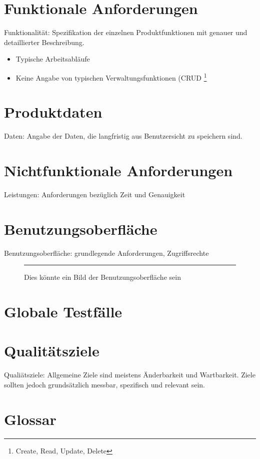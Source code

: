 \documentclass[a4paper]{scrreprt}
\begin{document}
\chapter{Funktionale Anforderungen}
Funktionalität: Spezifikation der einzelnen Produktfunktionen mit genauer und
detaillierter Beschreibung.
 
\begin{itemize}
  \item Typische Arbeitsabläufe
  \item Keine Angabe von typischen Verwaltungsfunktionen (CRUD \footnote{Create,
Read, Update, Delete}
\end{itemize}
 
\chapter{Produktdaten}
Daten: Angabe der Daten, die langfristig aus Benutzersicht zu speichern sind.
 
\chapter{Nichtfunktionale Anforderungen}
Leistungen: Anforderungen bezüglich Zeit und Genauigkeit
 
\chapter{Benutzungsoberfläche}
Benutzungsoberfläche: grundlegende Anforderungen, Zugriffsrechte
 
\begin{figure}[ht]
  \centering
  \rule{8cm}{6cm}
  \caption{Dies könnte ein Bild der Benutzungsoberfläche sein}
\end{figure}

\chapter{Globale Testfälle}
 
\chapter{Qualitätsziele}
Qualiätsziele: Allgemeine Ziele sind meistens Änderbarkeit und Wartbarkeit.
Ziele sollten jedoch grundsätzlich messbar, spezifisch und relevant sein.
 
\chapter{Glossar}
 
\listoffigures
 
\end{document}
